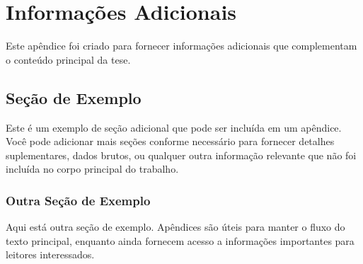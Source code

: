 \chapter{Informações Adicionais}
\label{chap:appendix-more}

\begin{introduction}
Este apêndice foi criado para fornecer informações adicionais que complementam o conteúdo principal da tese.
\end{introduction}

\section{Seção de Exemplo}
Este é um exemplo de seção adicional que pode ser incluída em um apêndice. Você pode adicionar mais seções conforme necessário para fornecer detalhes suplementares, dados brutos, ou qualquer outra informação relevante que não foi incluída no corpo principal do trabalho.

\subsection{Outra Seção de Exemplo}
Aqui está outra seção de exemplo. Apêndices são úteis para manter o fluxo do texto principal, enquanto ainda fornecem acesso a informações importantes para leitores interessados.



